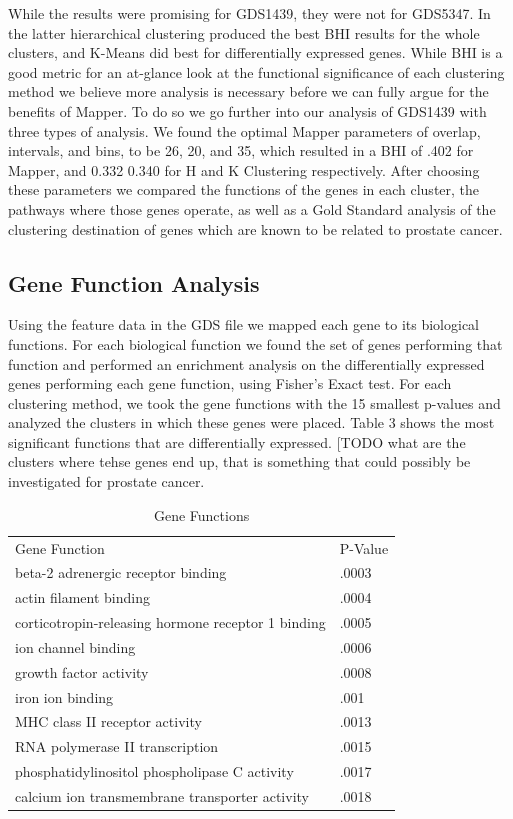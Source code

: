 \documentclass[preprint,10pt]{elsarticle}
\begin{document}
While the results were promising for GDS1439, they were not for GDS5347. In the latter hierarchical clustering produced the best BHI results for the whole clusters, and K-Means did best for differentially expressed genes. While BHI is a good metric for an at-glance look at the functional significance of each clustering method we believe more analysis is necessary before we can fully argue for the benefits of Mapper. To do so we go further into our analysis of GDS1439 with three types of analysis. We found the optimal Mapper parameters of overlap, intervals, and bins, to be 26, 20, and 35, which resulted in a BHI of .402 for Mapper, and 0.332 0.340 for H and K Clustering respectively. After choosing these parameters we compared the functions of the genes in each cluster, the pathways where those genes operate, as well as a Gold Standard analysis of the clustering destination of genes which are known to be related to prostate cancer. 


\subsection{Gene Function Analysis}
Using the feature data in the GDS file we mapped each gene to its biological functions. For each biological function we found the set of genes performing that function and performed an enrichment analysis on the differentially expressed genes performing each gene function, using Fisher's Exact test. For each clustering method, we took the gene functions with the 15 smallest p-values and analyzed the clusters in which these genes were placed. Table 3 shows the most significant functions that are differentially expressed. [TODO what are the clusters where tehse genes end up, that is something that could possibly be investigated for prostate cancer.

\begin{table}[]
\centering
\caption{Gene Functions}
\label{my-label}
\begin{tabular}{ll}
Gene Function                                      & P-Value \\
beta-2 adrenergic receptor binding                 & .0003   \\
actin filament binding                             & .0004   \\
corticotropin-releasing hormone receptor 1 binding & .0005   \\
ion channel binding                                & .0006   \\
growth factor activity                             & .0008   \\
iron ion binding                                   & .001    \\
MHC class II receptor activity                     & .0013   \\
RNA polymerase II transcription                    & .0015   \\
phosphatidylinositol phospholipase C activity      & .0017   \\
calcium ion transmembrane transporter activity     & .0018  
\end{tabular}
\end{table}
\end{document}
